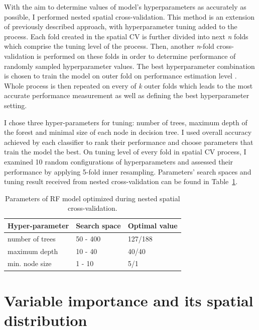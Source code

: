 \documentclass{amuthesis}
\begin{document}
With the aim to determine values of model's hyperparameters as
accurately as possible, I performed nested spatial cross-validation.
This method is an extension of previously described approach, with
hyperparameter tuning added to the process. Each fold created in the
spatial CV is further divided into next \emph{n} folds which comprise
the tuning level of the process. Then, another \emph{n}-fold
cross-validation is performed on these folds in order to determine
performance of randomly sampled hyperparameter values. The best
hyperparameter combination is chosen to train the model on outer fold on
performance estimation level \autocite{schratz_hyperparameter_2019}.
Whole process is then repeated on every of \emph{k} outer folds which
leads to the most accurate performance measurement as well as defining
the best hyperparameter setting.

I chose three hyper-parameters for tuning: number of trees, maximum
depth of the forest and minimal size of each node in decision tree. I
used overall accuracy achieved by each classifier to rank their
performance and choose parameters that train the model the best. On
tuning level of every fold in spatial CV process, I examined 10 random
configurations of hyperparameters and assessed their performance by
applying 5-fold inner resampling. Parameters' search spaces and tuning
result received from nested cross-validation can be found in
Table~\ref{tbl-tabela3}.

\hypertarget{tbl-tabela3}{}
\begin{table}
\caption{\label{tbl-tabela3}Parameters of RF model optimized during nested spatial cross-validation. }\tabularnewline

\centering
\begin{tabular}{|>{}l|>{}l|>{}l|}
\toprule
\textbf{Hyper-parameter} & \textbf{Search space} & \textbf{Optimal value}\\
\midrule
number of trees & 50 - 400 & 127/188\\
\hline
maximum depth & 10 - 40 & 40/40\\
\hline
min. node size & 1 - 10 & 5/1\\
\bottomrule
\end{tabular}
\end{table}

\hypertarget{sec-importance}{%
\section{Variable importance and its spatial
distribution}\label{sec-importance}}
\end{document}
